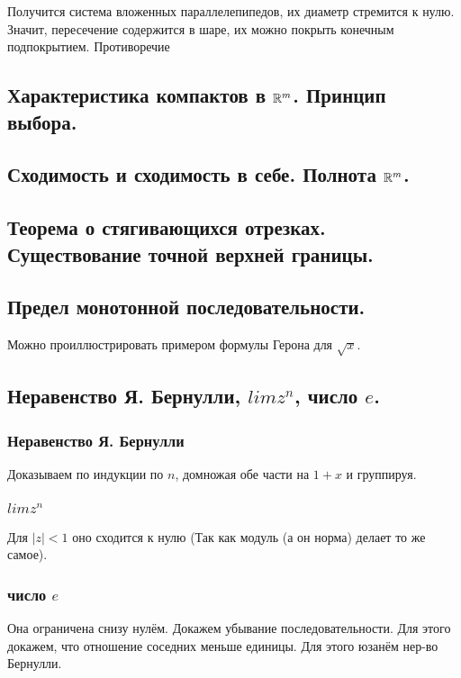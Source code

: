 \documentclass[12pt, a4paper]{article}
\begin{document}
Получится система вложенных параллелепипедов, их диаметр стремится к нулю.
Значит, пересечение содержится в шаре, их можно покрыть конечным подпокрытием.
Противоречие

\subsection{Характеристика компактов в ${\mathbb{R}}^m$. Принцип выбора.}

\subsection{Сходимость и сходимость в себе. Полнота ${\mathbb{R}}^m$.}

\subsection{Теорема о стягивающихся отрезках. Существование точной верхней границы.}

\subsection{Предел монотонной последовательности.}

Можно проиллюстрировать примером формулы Герона для $\sqrt{x}$.

\subsection{Неравенство Я. Бернулли, $lim z^n$, число $e$.}

\subsubsection{Неравенство Я. Бернулли}
    Доказываем по индукции по $n$, домножая обе части на $1 + x$ и группируя.

\subsubsection{$lim z^n$}
    Для $|z| < 1$ оно сходится к нулю (Так как модуль (а он норма) делает то же самое).

\subsubsection{число $e$}
    Она ограничена снизу нулём. Докажем убывание последовательности. Для этого докажем, что отношение соседних меньше единицы.
    Для этого юзанём нер-во Бернулли.
\end{document}

